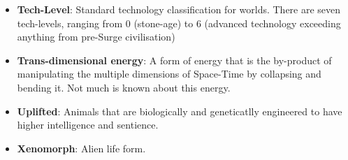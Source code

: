 \documentclass[10pt,twoside]{article}
\begin{document}
\begin{multicols}{2}
\begin{itemize}
            \item \textbf{Tech-Level}: Standard technology classification for worlds. There are seven tech-levels, ranging from 0 (stone-age) to 6 (advanced technology exceeding anything from pre-Surge civilisation)

            \item \textbf{Trans-dimensional energy}: A form of energy that is the by-product of manipulating the multiple dimensions of Space-Time by collapsing and bending it. Not much is known about this energy.

            \item \textbf{Uplifted}: Animals that are biologically and geneticatlly engineered to have higher intelligence and sentience.

            \item \textbf{Xenomorph}: Alien life form.

        \end{itemize}

    \end{multicols}
\end{document}
